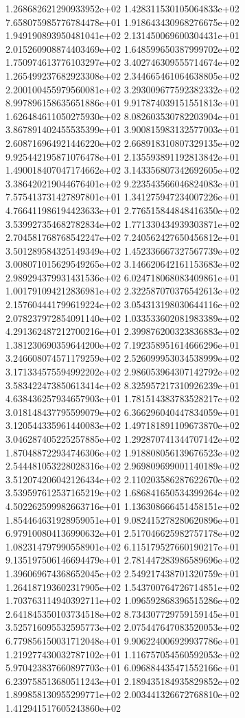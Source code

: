 1.268682621290933952e+02 1.428311530105064833e+02 7.658075985776784478e+01
1.918643430968276675e+02 1.949190893950481041e+02 2.131450069600304431e+01
2.015260908874403469e+02 1.648599650387999702e+02 1.750974613776103297e+02
3.402746309555714674e+02 1.265499237682923308e+02 2.344665461064638805e+02
2.200100455979560081e+02 3.293009677592382332e+02 8.997896158635651886e+01
9.917874039151551813e+01 1.626484611050275930e+02 8.082603530782203904e+01
3.867891402455535399e+01 3.900815983132577003e+01 2.608716964921446220e+02
2.668918310807329135e+02 9.925442195871076478e+01 2.135593891192813842e+01
1.490018407047174662e+02 3.143356807342692605e+02 3.386420219044676401e+02
9.223543566046824083e+01 7.575413731427897801e+01 1.341275947234007226e+01
4.766411986194423633e+01 2.776515844848416350e+02 3.539927354682782834e+02
1.771330434939303871e+02 2.704581768768542247e+02 7.240562427650456812e+01
3.501289584325149349e+02 1.452336667327567739e+02 3.008071015629549265e+02
3.146620642161153683e+02 2.989294379931431536e+02 6.024718068083409861e+01
1.001791094212836981e+02 2.322587070376542613e+02 2.157604441799619224e+02
3.054313198030644116e+02 2.078237972854091140e+02 1.033533602081983389e+02
4.291362487212700216e+01 2.399876200323836883e+02 1.381230690359644200e+02
7.192358951614666296e+01 3.246608074571179259e+02 2.526099953034538999e+02
3.171334575594992202e+02 2.986053964307142792e+02 3.583422473850613414e+02
8.325957217310926239e+01 4.638436257934657903e+01 1.781514383783528217e+02
3.018148437795599079e+02 6.366296040447834059e+01 3.120544335961440083e+02
1.497181891109673870e+02 3.046287405225257885e+02 1.292870741344707142e+02
1.870488722934746306e+02 1.918808056139676523e+02 2.544481053228028316e+02
2.969809699001140189e+02 3.512074206042126434e+02 2.110203586287622670e+02
3.539597612537165219e+02 1.686841650534399264e+02 4.502262599982663716e+01
1.136308666451458151e+02 1.854464631928959051e+01 9.082415278280620896e+01
6.979100804136990632e+01 2.517046625982757178e+02 1.082314797990558901e+02
6.115179527660190217e+01 9.135197506146694479e+01 2.781447283986589696e+02
1.396069674368652045e+02 2.549217438701320759e+01 1.264187193602317905e+02
1.543700764726714851e+02 1.703763114940392711e+02 1.096592868396515286e+02
2.641845350103734518e+02 8.734307729759159145e+01 3.525716095532595773e+02
2.075447647083520053e+02 6.779856150031712048e+01 9.906224006929937786e+01
1.219277430032787102e+01 1.116757054560592053e+02 5.970423837660897703e+01
6.096884435471552166e+01 6.239758513680511243e+01 2.189435184935829852e+02
1.899858130955299771e+02 2.003441326672768810e+02 1.412941517605243860e+02
